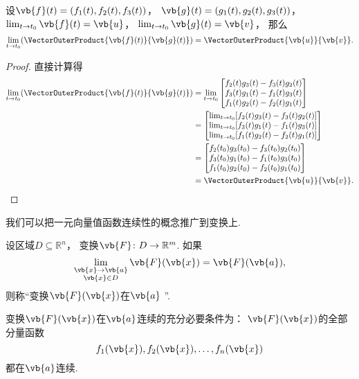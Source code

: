 \begin{theorem}
设\(\vb{f}(t) = (f_1(t),f_2(t),f_3(t))\)，
\(\vb{g}(t) = (g_1(t),g_2(t),g_3(t))\)，
\(\lim_{t \to t_0} \vb{f}(t) = \vb{u}\)，
\(\lim_{t \to t_0} \vb{g}(t) = \vb{v}\)，
那么\[
	\lim_{t \to t_0} (\VectorOuterProduct{\vb{f}(t)}{\vb{g}(t)})
	= \VectorOuterProduct{\vb{u}}{\vb{v}}.
\]
\begin{proof}
直接计算得\begin{align*}
	\lim_{t \to t_0} (\VectorOuterProduct{\vb{f}(t)}{\vb{g}(t)})
	&= \lim_{t \to t_0} \begin{bmatrix}
		f_2(t) g_3(t) - f_3(t) g_2(t) \\
		f_3(t) g_1(t) - f_1(t) g_3(t) \\
		f_1(t) g_2(t) - f_2(t) g_1(t) \\
	\end{bmatrix} \\
	&= \begin{bmatrix}
		\lim_{t \to t_0} [f_2(t) g_3(t) - f_3(t) g_2(t)] \\
		\lim_{t \to t_0} [f_3(t) g_1(t) - f_1(t) g_3(t)] \\
		\lim_{t \to t_0} [f_1(t) g_2(t) - f_2(t) g_1(t)] \\
	\end{bmatrix} \\
	&= \begin{bmatrix}
		f_2(t_0) g_3(t_0) - f_3(t_0) g_2(t_0) \\
		f_3(t_0) g_1(t_0) - f_1(t_0) g_3(t_0) \\
		f_1(t_0) g_2(t_0) - f_2(t_0) g_1(t_0) \\
	\end{bmatrix} \\
	&= \VectorOuterProduct{\vb{u}}{\vb{v}}.
	\qedhere
\end{align*}
\end{proof}
\end{theorem}

我们可以把一元向量值函数连续性的概念推广到变换上.
\begin{definition}
设区域\(D \subseteq \mathbb{R}^n\)，
变换\(\vb{F}\colon D \to \mathbb{R}^m\).
如果\[
	\lim_{\substack{
		\vb{x}\to\vb{a} \\
		\vb{x} \in D
	}} \vb{F}(\vb{x})
	= \vb{F}(\vb{a}),
\]
则称“变换\(\vb{F}(\vb{x})\)在\(\vb{a}\) ”.
\end{definition}

\begin{theorem}
变换\(\vb{F}(\vb{x})\)在\(\vb{a}\)连续的充分必要条件为：
\(\vb{F}(\vb{x})\)的全部分量函数\[
	f_1(\vb{x}),f_2(\vb{x}),\dotsc,f_n(\vb{x})
\]都在\(\vb{a}\)连续.
\end{theorem}

